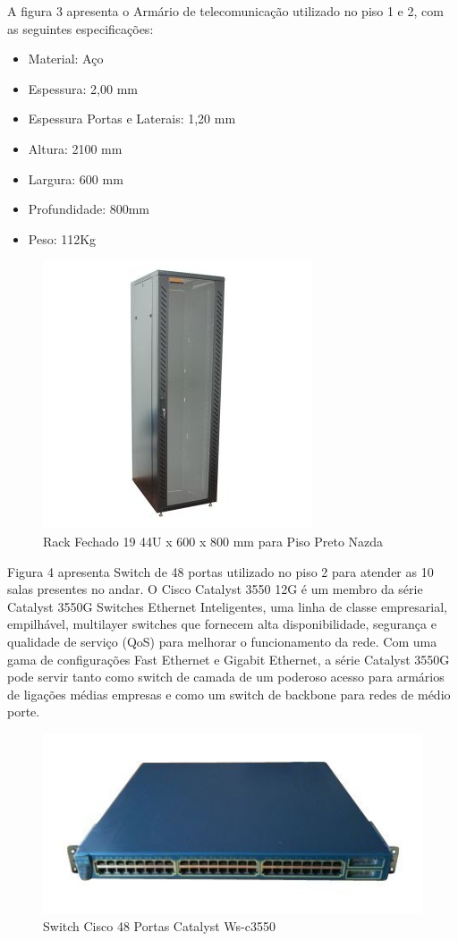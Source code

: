 \documentclass[	DIV=calc,%
							paper=a4,%
							fontsize=12pt,%
							onecolumn]{scrartcl}	 					%
\begin{document}
A figura 3 apresenta o Armário de telecomunicação utilizado no piso 1 e 2, com as seguintes especificações: 
\begin{itemize}
\item Material: Aço
\item Espessura: 2,00 mm
\item Espessura Portas e Laterais: 1,20 mm
\item Altura: 2100 mm
\item Largura: 600 mm
\item Profundidade: 800mm
\item Peso: 112Kg
\end{itemize}

\begin{figure}
\centering
\includegraphics[]{rack}
\caption{Rack Fechado 19 44U x 600 x 800 mm para Piso Preto Nazda }
\label{fig3}
\end{figure}


Figura 4 apresenta Switch de 48 portas utilizado no piso 2 para atender as 10 salas presentes no andar.
O Cisco Catalyst 3550 12G é um membro da série Catalyst 3550G Switches Ethernet Inteligentes, uma linha de classe empresarial, empilhável, multilayer switches que fornecem alta disponibilidade, segurança e qualidade de serviço (QoS) para melhorar o funcionamento da rede. Com uma gama de configurações Fast Ethernet e Gigabit Ethernet, a série Catalyst 3550G pode servir tanto como switch de camada de um poderoso acesso para armários de ligações médias empresas e como um switch de backbone para redes de médio porte.

\begin{figure}
	\centering
	\includegraphics[]{sw48}
	\caption{Switch Cisco 48 Portas Catalyst Ws-c3550}
	\label{fig4}
\end{figure}
\end{document}
